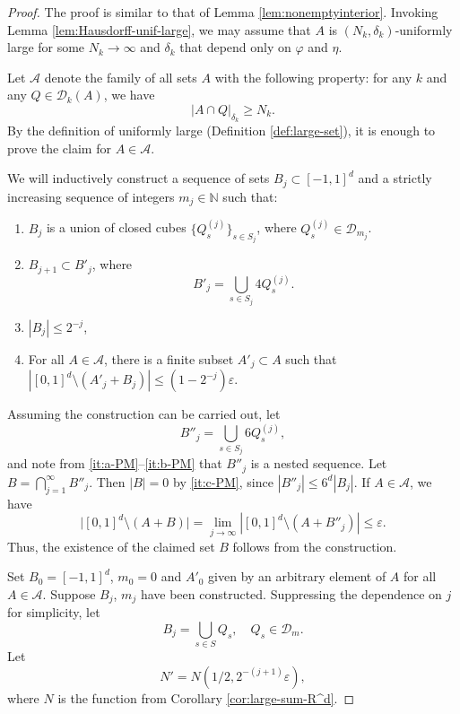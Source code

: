 \documentclass[10pt,a4paper]{amsart}
\def\N{{\mathbb{N}}}
\newcommand{\cD}{\mathcal{D}}
\newcommand{\e}{\varepsilon}
\renewcommand{\phi}{\varphi}
\begin{document}
\begin{proof}
    The proof is similar to that of Lemma \ref{lem:nonemptyinterior}. Invoking Lemma \ref{lem:Hausdorff-unif-large}, we may assume that $A$ is $(N_k,\delta_k)$-uniformly large for some $N_k\to\infty$ and $\delta_k$ that depend only on $\phi$ and $\eta$.

    Let $\mathcal{A}$ denote the family of all sets $A$ with the following property: for any $k$ and any $Q\in\mathcal{D}_k(A)$, we have
    \begin{equation} \label{eq:good-assumption}
        |A\cap Q|_{\delta_k} \ge N_k.
    \end{equation}
    By the definition of uniformly large (Definition \ref{def:large-set}), it is enough to prove the claim for $A\in\mathcal{A}$.

    We will inductively construct a sequence of sets $B_j\subset [-1,1]^d$ and a strictly increasing sequence of integers $m_j\in\N$ such that:
    \begin{enumerate}[label=(\alph*)]
        \item \label{it:a-PM} $B_j$ is a union of closed cubes $\{Q^{(j)}_s\}_{s\in S_j}$, where $Q^{(j)}_s\in\cD_{m_j}$.
        \item \label{it:b-PM} $B_{j+1}\subset B'_j$, where
        \[
            B'_j = \bigcup_{s\in S_j} 4 Q ^{(j)}_s.
        \]
        \item \label{it:c-PM} $|B_j|\le  2^{-j}$,
        \item \label{it:d-PM} For all $A\in\mathcal{A}$, there is a finite subset $A'_j\subset A$ such that $\left| [0,1]^d\setminus (A'_j+B_j)\right|\le (1-2^{-j})\e$.

    \end{enumerate}
    Assuming the construction can be carried out, let
    \[
        B''_j = \bigcup_{s\in S_j} 6 Q^{(j)}_s,
    \]
    and note from \ref{it:a-PM}--\ref{it:b-PM} that $B''_j$ is a nested sequence. Let $B=\bigcap_{j=1}^\infty B''_j$. Then $|B|=0$ by \ref{it:c-PM}, since $|B''_j|\le 6^d |B_j|$. If $A\in\mathcal{A}$, we have
    \[
        \bigl|[0,1]^d\setminus (A+B)\bigr| = \lim_{j\to\infty} \left|[0,1]^d\setminus (A+B''_j)\right| \le \e.
    \]
    Thus, the existence of the claimed set $B$ follows from the construction.

    Set $B_0=[-1,1]^d$, $m_0=0$ and $A'_0$ given by an arbitrary element of $A$ for all $A\in\mathcal{A}$. Suppose $B_j$, $m_j$ have been constructed. Suppressing the dependence on $j$ for simplicity, let
    \[
      B_j = \bigcup_{s\in S} Q_s, \quad Q_s\in\mathcal{D}_{m}.
    \]
    Let
    \[
        N' = N(1/2,2^{-(j+1)}\e),
    \]
    where $N$ is the function from Corollary \ref{cor:large-sum-R^d}.


\end{proof}
\end{document}
